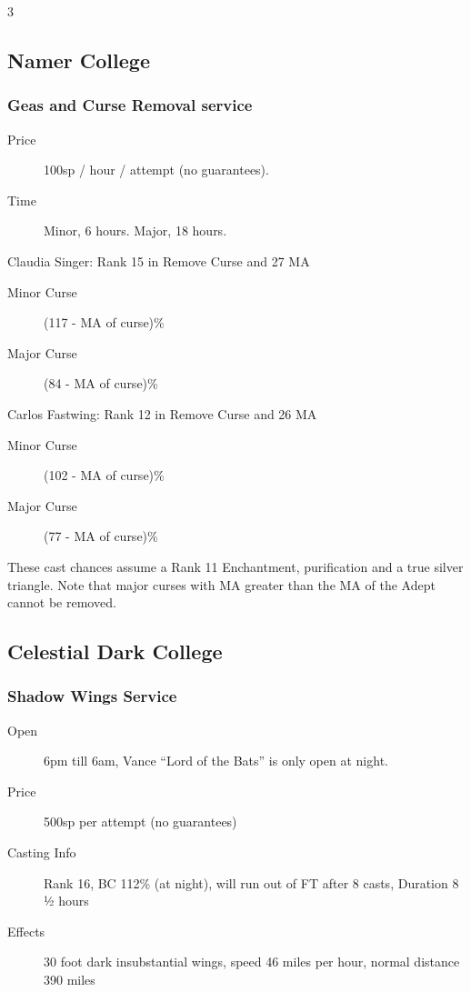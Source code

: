 \begin{multicols}{3}
\subsection{Namer College}

\subsubsection{Geas and Curse Removal service}

\begin{description}
\item[Price] 100sp / hour / attempt (no guarantees).
\item[Time] Minor, 6 hours. Major, 18 hours.
\end{description}

Claudia Singer:
Rank 15 in Remove Curse and 27 MA
\begin{description}
\item[Minor Curse] (117 - MA of curse)\%
\item[Major Curse] (84 - MA of curse)\%
\end{description}

Carlos Fastwing:
Rank 12 in Remove Curse and 26 MA
\begin{description}
\item[Minor Curse] (102 - MA of curse)\%
\item[Major Curse] (77 - MA of curse)\%
\end{description}

These cast chances assume a Rank 11 Enchantment, purification and a
true silver triangle.  Note that major curses with MA greater than the
MA of the Adept cannot be removed.

\subsection{Celestial Dark College}

\subsubsection{Shadow Wings Service}

\begin{description}
\item[Open] 6pm till 6am, Vance “Lord of the Bats” is only open at
  night.
\item[Price] 500sp per attempt (no guarantees)
\item[Casting Info] Rank 16, BC 112\% (at night), will run out of FT
  after 8 casts, Duration 8 ½ hours
\item[Effects] 30 foot dark insubstantial wings, speed 46 miles per
  hour, normal distance 390 miles
\end{description}


\end{multicols}

